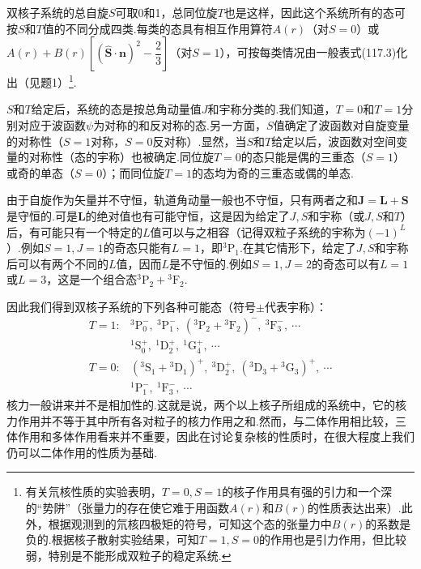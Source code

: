双核子系统的总自旋$S$可取0和1，总同位旋$T$也是这样，因此这个系统所有的态可按$S$和$T$值的不同分成四类.每类的态具有相互作用算符$A(r)$（对$S=0$）或$A(r)+B(r)\left[\left(\hat{\boldsymbol{S}}\cdot\boldsymbol{n}\right)^2-\dfrac{2}{3}\right]$（对$S=1$），可按每类情况由一般表式(117.3)化出（见题1）\footnote{有关氘核性质的实验表明，$T=0,S=1$的核子作用具有强的引力和一个深的“势阱”（张量力的存在使它难于用函数$A(r)$和$B(r)$的性质表达出来）.此外，根据观测到的氘核四极矩的符号，可知这个态的张量力中$B(r)$的系数是负的.根据核子散射实验结果，可知$T=1,S=0$的作用也是引力作用，但比较弱，特别是不能形成双粒子的稳定系统.}.

$S$和$T$给定后，系统的态是按总角动量值$J$和宇称分类的.我们知道，$T=0$和$T=1$分别对应于波函数$\psi$为对称的和反对称的态.另一方面，$S$值确定了波函数对自旋变量的对称性（$S=1$对称，$S=0$反对称）.显然，当$S$和$T$给定以后，波函数对空间变量的对称性（态的宇称）也被确定.同位旋$T=0$的态只能是偶的三重态（$S=1$）或奇的单态（$S=0$）；而同位旋$T=1$的态均为奇的三重态或偶的单态.

由于自旋作为矢量并不守恒，轨道角动量一般也不守恒，只有两者之和$\boldsymbol{J}=\boldsymbol{L}+\boldsymbol{S}$是守恒的.可是$\boldsymbol{L}$的绝对值也有可能守恒，这是因为给定了$J,S$和宇称（或$J,S$和$T$）后，有可能只有一个特定的$L$值可以与之相容（记得双粒子系统的宇称为$(-1)^L$）.例如$S=1,J=1$的奇态只能有$L=1$，即${}^{3}\mathrm{P}_1$.在其它情形下，给定了$J,S$和宇称后可以有两个不同的$L$值，因而$L$是不守恒的.例如$S=1,J=2$的奇态可以有$L=1$或$L=3$，这是一个组合态${}^{3}\mathrm{P}_2+{}^{3}\mathrm{F}_2$.

因此我们得到双核子系统的下列各种可能态（符号$\pm$代表宇称）：
\begin{equation*}
\begin{array}{rl}
  T=1: & {}^{3}\mathrm{P}_0^-,\ {}^{3}\mathrm{P}_1^-,\ ({}^{3}\mathrm{P}_2+{}^{3}\mathrm{F}_2)^-,\ {}^{3}\mathrm{F}_3^-,\ \cdots\\
  & {}^{1}\mathrm{S}_0^+,\ {}^{1}\mathrm{D}_2^+,\ {}^{1}\mathrm{G}_4^+,\ \cdots\\
  T=0: & ({}^{3}\mathrm{S}_1+{}^{3}\mathrm{D}_1)^+,\ {}^{3}\mathrm{D}_2^+,\ ({}^{3}\mathrm{D}_3+{}^{3}\mathrm{G}_3)^+,\ \cdots\\
  & {}^{1}\mathrm{P}_1^-,\ {}^{1}\mathrm{F}_3^-,\ \cdots
\end{array}
\end{equation*}
核力一般讲来并不是相加性的.这就是说，两个以上核子所组成的系统中，它的核力作用并不等于其中所有各对粒子的核力作用之和.然而，与二体作用相比较，三体作用和多体作用看来并不重要，因此在讨论复杂核的性质时，在很大程度上我们仍可以二体作用的性质为基础.

